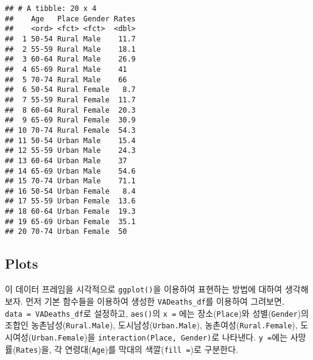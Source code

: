 \documentclass[
]{article}
\newenvironment{Shaded}{\begin{snugshade}}{\end{snugshade}}
\newcommand{\DataTypeTok}[1]{\textcolor[rgb]{0.13,0.29,0.53}{#1}}
\newcommand{\KeywordTok}[1]{\textcolor[rgb]{0.13,0.29,0.53}{\textbf{#1}}}
\newcommand{\NormalTok}[1]{#1}
\newcommand{\OperatorTok}[1]{\textcolor[rgb]{0.81,0.36,0.00}{\textbf{#1}}}
\newcommand{\StringTok}[1]{\textcolor[rgb]{0.31,0.60,0.02}{#1}}
\begin{document}
\begin{Shaded}
\end{Shaded}

\begin{verbatim}
## # A tibble: 20 x 4
##    Age   Place Gender Rates
##    <ord> <fct> <fct>  <dbl>
##  1 50-54 Rural Male    11.7
##  2 55-59 Rural Male    18.1
##  3 60-64 Rural Male    26.9
##  4 65-69 Rural Male    41  
##  5 70-74 Rural Male    66  
##  6 50-54 Rural Female   8.7
##  7 55-59 Rural Female  11.7
##  8 60-64 Rural Female  20.3
##  9 65-69 Rural Female  30.9
## 10 70-74 Rural Female  54.3
## 11 50-54 Urban Male    15.4
## 12 55-59 Urban Male    24.3
## 13 60-64 Urban Male    37  
## 14 65-69 Urban Male    54.6
## 15 70-74 Urban Male    71.1
## 16 50-54 Urban Female   8.4
## 17 55-59 Urban Female  13.6
## 18 60-64 Urban Female  19.3
## 19 65-69 Urban Female  35.1
## 20 70-74 Urban Female  50
\end{verbatim}

\hypertarget{plots}{%
\subsection{Plots}\label{plots}}

이 데이터 프레임을 시각적으로 \texttt{ggplot()}을 이용하여 표현하는
방법에 대하여 생각해 보자. 먼저 기본 함수들을 이용하여 생성한
\texttt{VADeaths\_df}를 이용하여 그려보면,
\texttt{data\ =\ VADeaths\_df}로 설정하고, \texttt{aes()}의
\texttt{x\ =} 에는 장소(\texttt{Place})와 성별(\texttt{Gender})의 조합인
농촌남성(\texttt{Rural.Male}), 도시남성(\texttt{Urban.Male}),
농촌여성(\texttt{Rural.Female}), 도시여성(\texttt{Urban.Female})을
\texttt{interaction(Place,\ Gender)}로 나타낸다. \texttt{y\ =}에는
사망률(\texttt{Rates})을, 각 연령대(\texttt{Age})를 막대의
색깔(\texttt{fill\ =})로 구분한다.
\end{document}
